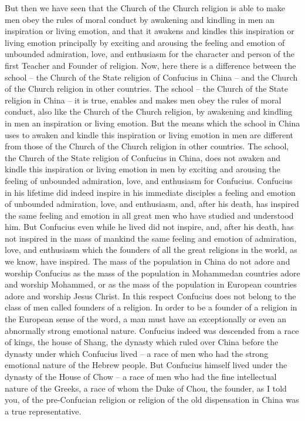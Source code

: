 But then we have seen that the Church of the Church religion is able to make men obey the rules of moral conduct by awakening and kindling in men an inspiration or living emotion, and that it awakens and kindles this inspiration or living emotion principally by exciting and arousing the feeling and emotion of unbounded admiration, love, and enthusiasm for the character and person of the first Teacher and Founder of religion.
Now, here there is a difference between the school -- the Church of the State religion of Confucius in China -- and the Church of the Church religion in other countries.
The school --  the Church of the State religion in China -- it is true, enables and makes men obey the rules of moral conduct, also like the Church of the Church religion, by awakening and kindling in men an inspiration or living emotion.
But the means which the school in China uses to awaken and kindle this inspiration or living emotion in men are different from those of the Church of the Church religion in other countries.
The school, the Church of the State religion of Confucius in China, does not awaken and kindle this inspiration or living emotion in men by exciting and arousing the feeling of unbounded admiration, love, and enthusiasm for Confucius.
Confucius in his lifetime did indeed inspire in his immediate disciples a feeling and emotion of unbounded admiration, love, and enthusiasm, and, after his death, has inspired the same feeling and emotion in all great men who have studied and understood him.
But Confucius even while he lived did not inspire, and, after his death, has not inspired in the mass of mankind the same feeling and emotion of admiration, love, and enthusiasm which the founders of all the great religions in the world, as we know, have inspired.
The mass of the population in China do not adore and worship Confucius as the mass of the population in Mohammedan countries adore and worship Mohammed, or as the mass of the population in European countries adore and worship Jesus Christ.
In this respect Confucius does not belong to the class of men called founders of a religion.
In order to be a founder of a religion in the European sense of the word, a man must have an exceptionally or even an abnormally strong emotional nature.
Confucius indeed was descended from a race of kings, the house of Shang, the dynasty which ruled over China before the dynasty under which Confucius lived -- a race of men who had the strong emotional nature of the Hebrew people.
But Confucius himself lived under the dynasty of the House of Chow -- a race of men who had the fine intellectual nature of the Greeks, a race of whom the Duke of Chou, the founder, as I told you, of the pre-Confucian religion or religion of the old dispensation in China was a true representative.
